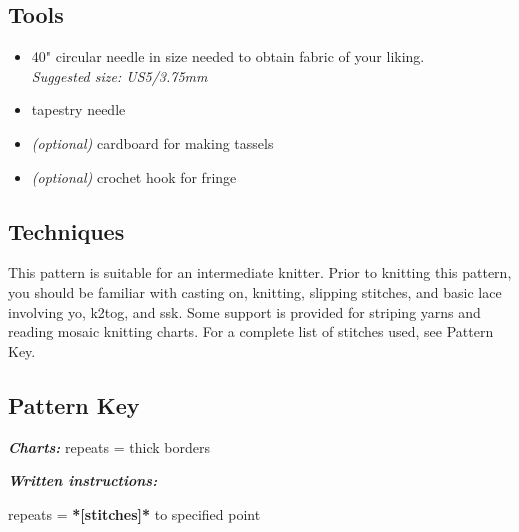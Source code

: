 \documentclass[12pt]{article}
\newcommand{\vocab}[1]{\emph{\textbf{#1}}} %
\begin{document}
\begin{multicols}{2}
\subsection*{Tools}

\begin{itemize}
\item 40" circular needle in size needed to obtain fabric of your liking. \\ \emph{Suggested size: US5/3.75mm} \vspace{-.5em}
\item tapestry needle \vspace{-.5em}
\item \emph{(optional)} cardboard for making tassels \vspace{-.5em}
\item \emph{(optional)} crochet hook for fringe \vspace{-.5em}
\end{itemize}

\subsection*{Techniques}

This pattern is suitable for an intermediate knitter. %
Prior to knitting this pattern, you should be familiar with casting on, knitting, slipping stitches, and basic lace involving yo, k2tog, and ssk. Some support is provided for striping yarns and reading mosaic knitting charts. %
For a complete list of stitches used, see Pattern Key.


\normalsize

\subsection*{Pattern Key}

\vocab{Charts:} repeats = thick borders \chart{\!\underline{\overline{-}}\!}  

\vocab{Written instructions:} 

repeats = \textbf{*[stitches]*} to specified point
\vspace{-1em}


\end{multicols}
\end{document}
